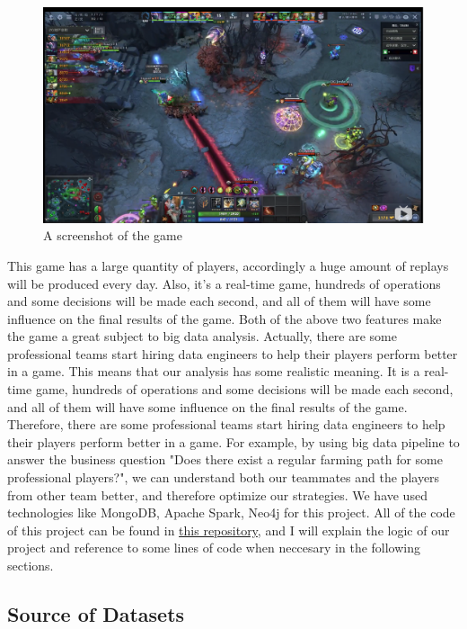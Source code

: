 \documentclass{article}
\begin{document}
\begin{figure}[H]
    \centering
    \includegraphics[width=\linewidth]{pic/combat.png}
    \caption{A screenshot of the game}
\end{figure}
This game has a large quantity of players, accordingly a huge amount of replays will be produced every day. Also, it's a real-time game, hundreds of operations and some decisions will be made each second, and all of them will have some influence on the final results of the game. Both of the above two features make the game a great subject to big data analysis. Actually, there are some professional teams start hiring data engineers to help their players perform better in a game. This means that our analysis has some realistic meaning.
It is a real-time game, hundreds of operations and some decisions will be made each second, and all of them will have some influence on the final results of the game. Therefore, there are some professional teams start hiring data engineers to help their players perform better in a game. For example, by using big data pipeline to answer the business question "Does there exist a regular farming path for some professional players?", we can understand both our teammates and the players from other team better, and therefore optimize our strategies.
We have used technologies like MongoDB, Apache Spark, Neo4j for this project. All of the code of this project can be found in \href{https://github.com/Vopaaz/big-data-psg-lgd/tree/a9a285e0e29c0d9e56b41994875df830c7e7b51b}{this repository}, and I will explain the logic of our project and reference to some lines of code when neccesary in the following sections.
\subsection{Source of Datasets}
\end{document}
